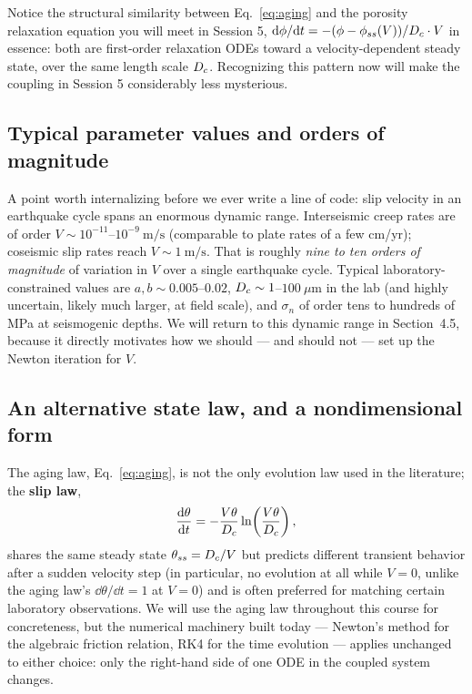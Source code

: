 \begin{remark}
Notice the structural similarity between Eq.~\eqref{eq:aging} and the porosity relaxation equation you will meet in Session 5, $\mathrm{d}\phi/\mathrm{d} t = -(\phi - \phi_{ss}(V))/D_c \cdot V$ in essence: both are first-order relaxation ODEs toward a velocity-dependent steady state, over the same length scale $D_c$. Recognizing this pattern now will make the coupling in Session 5 considerably less mysterious.
\end{remark}

\subsection{Typical parameter values and orders of magnitude}

A point worth internalizing before we ever write a line of code: slip velocity in an earthquake cycle spans an enormous dynamic range. Interseismic creep rates are of order $V \sim 10^{-11}$--$10^{-9}\ \mathrm{m/s}$ (comparable to plate rates of a few cm/yr); coseismic slip rates reach $V \sim 1\ \mathrm{m/s}$. That is roughly \emph{nine to ten orders of magnitude} of variation in $V$ over a single earthquake cycle. Typical laboratory-constrained values are $a, b \sim 0.005$--$0.02$, $D_c \sim 1$--$100\ \mu\mathrm{m}$ in the lab (and highly uncertain, likely much larger, at field scale), and $\sigma_n$ of order tens to hundreds of MPa at seismogenic depths. We will return to this dynamic range in Section~4.5, because it directly motivates how we should --- and should not --- set up the Newton iteration for $V$.

\subsection{An alternative state law, and a nondimensional form}

The aging law, Eq.~\eqref{eq:aging}, is not the only evolution law used in the literature; the \textbf{slip law},
\begin{equation}
\frac{\mathrm{d} \theta}{\mathrm{d} t} = -\frac{V\theta}{D_c}\ln\!\left(\frac{V\theta}{D_c}\right),
\end{equation}
shares the same steady state $\theta_{ss}=D_c/V$ but predicts different transient behavior after a sudden velocity step (in particular, no evolution at all while $V=0$, unlike the aging law's $\dd\theta/\dd t = 1$ at $V=0$) and is often preferred for matching certain laboratory observations. We will use the aging law throughout this course for concreteness, but the numerical machinery built today --- Newton's method for the algebraic friction relation, RK4 for the time evolution --- applies unchanged to either choice: only the right-hand side of one ODE in the coupled system changes.

